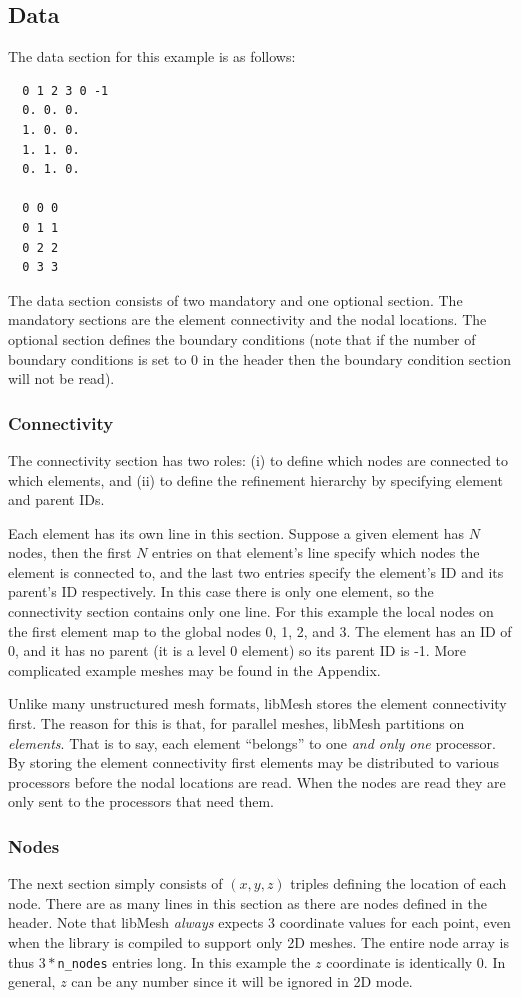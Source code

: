 \documentclass[12pt]{article}
\begin{document}
\subsection{Data}
The data section for this example is as follows:
\small
\begin{verbatim}
  0 1 2 3 0 -1
  0. 0. 0. 
  1. 0. 0.
  1. 1. 0.
  0. 1. 0.
  
  0 0 0
  0 1 1
  0 2 2
  0 3 3
\end{verbatim}
\normalsize

The data section consists of two mandatory and one optional section.  The mandatory sections are the element connectivity and the nodal locations.  The optional section defines the boundary conditions (note that if the number of boundary conditions is set to 0 in the header then the boundary condition section will not be read).

\subsubsection{Connectivity}
The connectivity section has two roles: (i) to define which nodes are connected to which elements, and (ii) to define the refinement hierarchy by specifying element and parent IDs.

Each element has its own line in this section. Suppose a given element has $N$ nodes, then the first $N$ entries on that element's line specify which nodes the element is connected to, and the last two entries specify the element's ID and its parent's ID respectively. In this case there is only one element, so the connectivity section contains only one line.  For this example the local nodes on the first element map to the global nodes 0, 1, 2, and 3. The element has an ID of 0, and it has no parent (it is a level 0 element) so its parent ID is -1.  More complicated example meshes may be found in the Appendix.

Unlike many unstructured mesh formats, libMesh stores the element connectivity first.  The reason for this is that, for parallel meshes, libMesh partitions on \emph{elements}.  That is to say, each element ``belongs'' to one \emph{and only one} processor.  By storing the element connectivity first elements may be distributed to various processors before the nodal locations are read.  When the nodes are read they are only sent to the processors that need them.

\subsubsection{Nodes}
The next section simply consists of $(x,y,z)$ triples defining the location of each node.  There are as many lines in this section as there are nodes defined in the header.  Note that libMesh \emph{always} expects 3 coordinate values for each point, even when the library is compiled to support only 2D meshes. The entire node array is thus $3*$\texttt{n\_nodes} entries long.  In this example the $z$ coordinate is identically 0.  In general, $z$ can be any number since it will be ignored in 2D mode.
\end{document}
